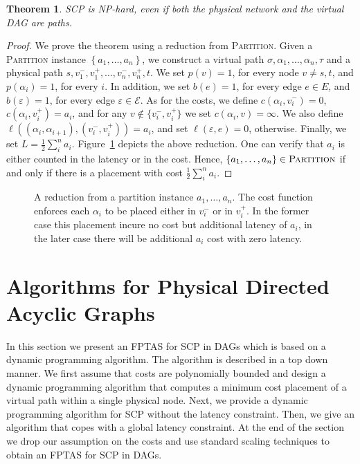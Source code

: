 \documentclass[11pt]{article}
\newtheorem{theorem}{Theorem}
\newcommand{\set}[1]{\left\{ #1 \right\}}
\newcommand{\half}{\frac{1}{2}}
\newcommand{\eps}{\varepsilon}
\newcommand{\scp}{\textsc{SCP}\xspace}
\newcommand{\calE}{\mathcal{E}}
\begin{document}
\begin{theorem}
\scp is NP-hard, even if both the physical network and the virtual DAG
are paths.
\end{theorem}
\begin{proof}
We prove the theorem using a reduction from \textsc{Partition}.  Given
a \textsc{Partition} instance $\set{a_1, \ldots, a_n}$, we construct a
virtual path $\sigma, \alpha_1, \ldots, \alpha_n, \tau$ and a physical
path $s, v_1^-, v_1^+, \ldots, v_n^-, v_n^+, t$.  We set $p(v) = 1$,
for every node $v \neq s,t$, and $p(\alpha_i) = 1$, for every $i$.  In
addition, we set $b(e) = 1$, for every edge $e \in E$, and $b(\eps) =
1$, for every edge $\eps \in \calE$.
%
As for the costs, we define $c(\alpha_i, v_i^-) = 0$, $c(\alpha_i,
v_i^+) = a_i$, and for any $v \notin \{v_i^-,v_i^+\}$ we set
$c(\alpha_i, v) = \infty$.  We also define $\ell((\alpha_i,\alpha_{i+1}),
(v_i^-,v_i^+)) = a_i$, and set $\ell(\eps,e) = 0$, otherwise.  Finally,
we set $L = \half \sum_i^n a_i$.
%
Figure~\ref{fig:reduction2} depicts the above reduction.
%
One can verify that $a_i$ is either counted in the latency or in the
cost.  Hence, $\set{a_1, \ldots, a_n} \in \textsc{Partition}$ if and
only if there is a placement with cost $\half \sum_i^n a_i$.
\end{proof}


\begin{figure}[t]
\centering
\scalebox{.75}{

}
\caption{A reduction from a partition instance $a_1, \ldots, a_n$.
  The cost function enforces each $\alpha_i$ to be placed either in
  $v_i^-$ or in $v_i^+$.  In the former case this placement incure no
  cost but additional latency of $a_i$, in the later case there will
  be additional $a_i$ cost with zero latency.}
\label{fig:reduction2}
\end{figure}



\section{Algorithms for Physical Directed Acyclic Graphs}
\label{sec:algorithms}

In this section we present an FPTAS for \scp in DAGs which is based on
a dynamic programming algorithm.
%
The algorithm is described in a top down manner.  We first assume that
costs are polynomially bounded and design a dynamic programming
algorithm that computes a minimum cost placement of a virtual path
within a single physical node.  Next, we provide a dynamic programming
algorithm for \scp without the latency constraint.  Then, we give an
algorithm that copes with a global latency constraint.  At the end of
the section we drop our assumption on the costs and use standard
scaling techniques to obtain an FPTAS for \scp in DAGs.
\end{document}
